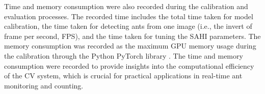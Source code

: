 Time and memory consumption were also recorded during the calibration and evaluation processes. The recorded time includes the total time taken for model calibration, the time taken for detecting ants from one image (i.e., the invert of frame per second, FPS), and the time taken for tuning the SAHI parameters. The memory consumption was recorded as the maximum GPU memory usage during the calibration through the Python PyTorch library \cite{paszke_pytorch_2019}. The time and memory consumption were recorded to provide insights into the computational efficiency of the CV system, which is crucial for practical applications in real-time ant monitoring and counting.